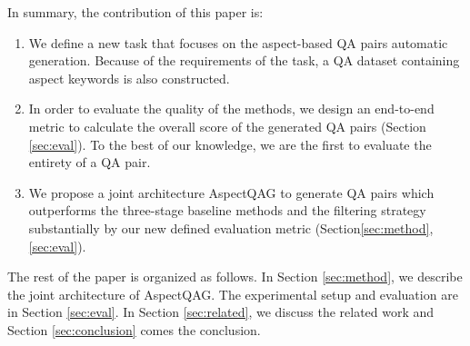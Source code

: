 In summary, the contribution of this paper is:
\begin{enumerate}
\item We define a new task that focuses on the aspect-based QA pairs automatic generation.  Because of the requirements of the task, a  QA dataset containing aspect keywords is also constructed.
\item In order to evaluate the quality of the methods, we design an end-to-end metric to calculate the overall score of the generated QA pairs (Section \ref{sec:eval}). To the best of our knowledge, we are the first to evaluate the entirety of a QA pair.
\item We propose a joint architecture AspectQAG to generate QA pairs which outperforms the three-stage baseline methods and the filtering strategy substantially by our new defined evaluation metric (Section{\ref{sec:method},\ref{sec:eval}}).
\end{enumerate}

The rest of the paper is organized as follows. In Section \ref{sec:method}, we describe the joint architecture of AspectQAG.
The experimental setup and evaluation are in Section \ref{sec:eval}. 
In Section \ref{sec:related}, we discuss the related work and Section \ref{sec:conclusion} comes the conclusion.
 
